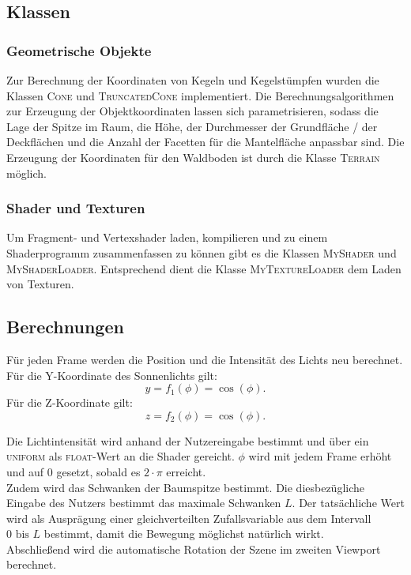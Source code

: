 \documentclass{scrartcl}
\begin{document}
\subsection{Klassen}

\subsubsection{Geometrische Objekte}
Zur Berechnung der Koordinaten von Kegeln und Kegelstümpfen wurden die Klassen \textsc{Cone} und \textsc{TruncatedCone} implementiert. 
Die Berechnungsalgorithmen zur Erzeugung der Objektkoordinaten lassen sich parametrisieren, sodass die Lage der Spitze im Raum, die Höhe, der Durchmesser der Grundfläche / der Deckflächen und die Anzahl der Facetten für die Mantelfläche anpassbar sind.
Die Erzeugung der Koordinaten für den Waldboden ist durch die Klasse \textsc{Terrain} möglich.

\subsubsection{Shader und Texturen}
Um Fragment- und Vertexshader laden, kompilieren und zu einem Shaderprogramm zusammenfassen zu können gibt es die Klassen
\textsc{MyShader} und \textsc{MyShaderLoader}.
Entsprechend dient die Klasse \textsc{MyTextureLoader} dem Laden von Texturen.

\subsection{Berechnungen}

Für jeden Frame werden die Position und die Intensität des Lichts neu berechnet.
Für die \textsc{Y}-Koordinate des Sonnenlichts gilt:
$$y = f_1(\phi) = \cos(\phi)\textrm{.}$$
Für die \textsc{Z}-Koordinate gilt: 
$$z = f_2(\phi) = \cos(\phi)\textrm{.}$$

Die Lichtintensität wird anhand der Nutzereingabe bestimmt und über ein \textsc{uniform} als \textsc{float}-Wert an die Shader gereicht.
$\phi$ wird mit jedem Frame erhöht und auf $0$ gesetzt, sobald es $2\cdot\pi$ erreicht.
\\ 
Zudem wird das Schwanken der Baumspitze bestimmt. Die diesbezügliche Eingabe des Nutzers bestimmt das maximale Schwanken $L$.
Der tatsächliche Wert wird als Ausprägung einer gleichverteilten Zufallsvariable aus dem Intervall 
$0 \textrm{ bis } L$
bestimmt, damit die Bewegung möglichst natürlich wirkt.
\\
Abschließend wird die automatische Rotation der Szene im zweiten Viewport berechnet.
\end{document}
